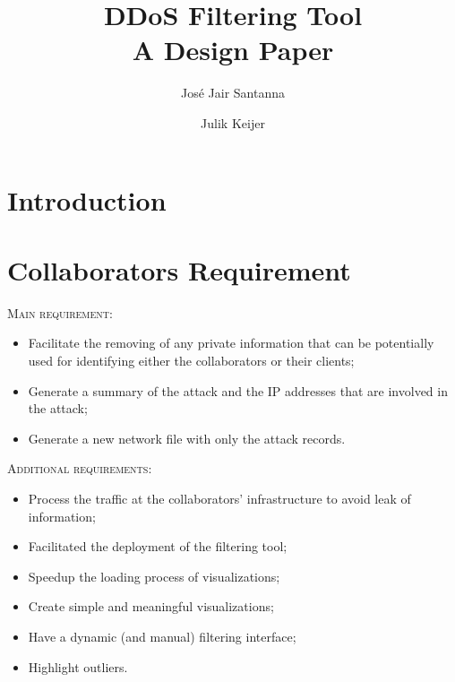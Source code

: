 \documentclass{llncs}
\begin{document}
\title{\huge DDoS Filtering Tool\\ \small A Design Paper}

\author{Jos\'e Jair Santanna \and Julik Keijer}
\maketitle             


\section{Introduction}

\section{Collaborators Requirement}

\noindent
\textsc{Main requirement:} 
\begin{itemize}
	\item Facilitate the removing of any private information that can be potentially used for identifying either the collaborators or their clients;
	\item Generate a summary of the attack and the IP addresses that are involved in the attack;
	\item Generate a new network file with only the attack records.
\end{itemize}

\noindent
\textsc{Additional requirements:}
\begin{itemize}
	\item Process the traffic at the collaborators' infrastructure to avoid leak of information;
	\item Facilitated the deployment of the filtering tool; 
	\item Speedup the loading process of visualizations;
	\item Create simple and meaningful visualizations;
	\item Have a dynamic (and manual) filtering interface;
	\item Highlight outliers.
\end{itemize}
\end{document}
